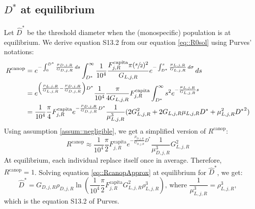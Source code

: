 \begin{refsection}
\subsection{$ D^{*} $ at equilibrium \citep[equation S13.2]{Purves2009}}
Let $ \hat D^{*} $ be the threshold diameter when the (monospecific) population is at equilibrium. We derive equation S13.2 \citep{Purves2009} from our equation \eqref{eq::R0sol} using Purves' notations:
\begin{align*}
	R^{\text{canop}} &= e^{-\int_{0}^{D^{*}} \frac{\mu_{D, j, R}}{G_{D, j, R}} \, ds} \int_{D^{*}}^{\infty} \frac{1}{10^4} \frac{F_{j, R}^{\text{capita}} \pi (\sfrac{s}{2})^2}{G_{L, j, R}} e^{-\int_{D^{*}}^{s} \frac{\mu_{L, j, R}}{G_{L, j, R}} \, d\sigma} \, ds \\
		&= e^{\left(\frac{\mu_{L, j, R}}{G_{L, j, R}} - \frac{\mu_{D, j, R}}{G_{D, j, R}} \right) D^{*}} \frac{1}{10^4} \frac{\pi}{4 G_{L, j, R}} F_{j, R}^{\text{capita}} \int_{D^{*}}^{\infty} s^2 e^{-\frac{\mu_{L, j, R}}{G_{L, j, R}} s} \\
		&= \frac{1}{10^4} \frac{\pi}{4} F_{j, R}^{\text{capita}} e^{- \frac{\mu_{D, j, R}}{G_{D, j, R}} D^{*}} \frac{1}{\mu_{L, j, R}^3} (2 G_{L, j, R}^2 + 2 G_{L, j, R} \mu_{L, j, R} D^{*} + \mu_{L, j, R}^2 {D^{*}}^2)
\end{align*}
Using assumption \ref{assum::negligible}, we get a simplified version of $ R^{\text{canop}} $:
\begin{equation} \label{eq::RcanopApprox}
	R^{\text{canop}} \approx \frac{1}{10^4} \frac{\pi}{2} F_{j, R}^{\text{capita}} e^{- \frac{\mu_{D, j, R}}{G_{D, j, R}} D^{*}} \frac{1}{\mu_{D, j, R}^3} G_{L, j, R}^2
\end{equation}
At equilibrium, each individual replace itself once in average. Therefore, $ R^{\text{canop}} = 1 $. Solving equation \eqref{eq::RcanopApprox} at equilibrium for $ \hat D^{*} $, we get:
\[
	\hat D^{*} = G_{D, j, R} \rho_{D, j, R} \ln \left( \frac{1}{10^4} \frac{\pi}{2} F_{j, R}^{\text{capita}} G_{L, j, R}^2 \rho_{L, j, R}^3 \right) \text{, where } \frac{1}{\mu_{L, j, R}^3} = \rho_{L, j, R}^3,
\]
which is the equation S13.2 of Purves.

\printbibliography[heading=subbibliography]
\end{refsection}
